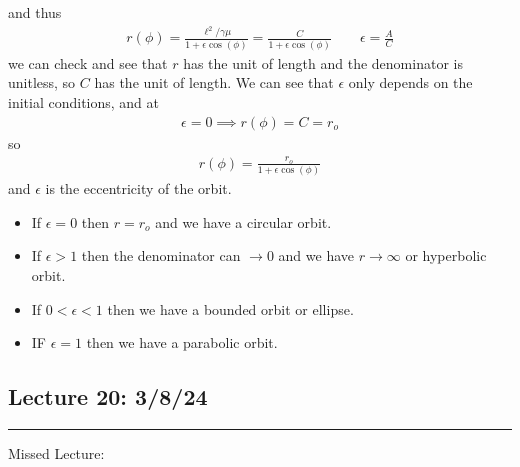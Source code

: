 \documentclass[../main.tex]{subfiles}
\begin{document}
and thus
\begin{align*}
    r(\phi) = \frac{\ell^2/\gamma \mu}{1 + \epsilon \cos(\phi)} = \frac{C}{1 + \epsilon \cos(\phi)}
    \qquad \epsilon = \frac{A}{C}
\end{align*}
we can check and see that $r$ has the unit of length and the denominator is unitless, so $C$ has
the unit of length. We can see that $\epsilon$ only depends on the initial conditions, and at
\begin{align*}
    \epsilon = 0 \implies r(\phi) = C = r_o
\end{align*}
so
\begin{align*}
    r(\phi) = \frac{r_o}{1 + \epsilon \cos(\phi)}
\end{align*}
and $\epsilon$ is the eccentricity of the orbit.
\begin{itemize}
    \item If $\epsilon = 0$ then $r = r_o$ and we have a circular orbit.
    \item If $\epsilon > 1$ then the denominator can $\to 0$ and we have $ r \to \infty$ or hyperbolic
        orbit.
    \item If $0 < \epsilon < 1$ then we have a bounded orbit or ellipse.
    \item IF $\epsilon = 1$ then we have a parabolic orbit.
\end{itemize}

\newpage
\subsection*{Lecture 20: \hfill  3/8/24}
\hrule \vspace{10px}
Missed Lecture:
\end{document}
